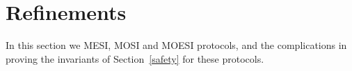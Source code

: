 \section{Refinements}
\label{sec:Refinements}

In this section we MESI, MOSI and MOESI protocols, and the
complications in proving the invariants of Section~\ref{safety} for these protocols.

%
%
%
%
%
%
